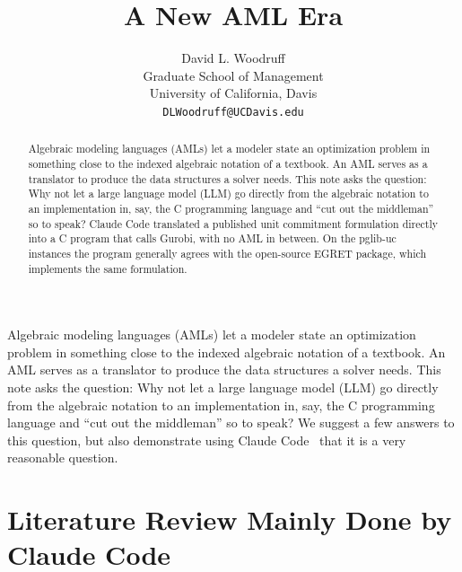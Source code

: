 \documentclass[11pt]{article}
\title{A New AML Era}
\author{David L. Woodruff\\Graduate School of Management\\University of California, Davis\\\texttt{DLWoodruff@UCDavis.edu}}
\date{}
\begin{document}
\maketitle

\begin{abstract}
Algebraic modeling languages (AMLs) let a modeler state an
optimization problem in something close to the indexed algebraic
notation of a textbook. An AML serves as a translator to produce the data
structures a solver needs.  This note asks the question: Why not let a
large language model (LLM) go directly from the algebraic notation to
an implementation in, say, the C programming language and ``cut out the
middleman'' so to speak?
Claude Code translated a published unit commitment formulation directly into a C program that calls Gurobi, with no AML in between. On the pglib-uc instances the program generally agrees with the open-source EGRET package, which implements the same formulation.
\end{abstract}

Algebraic modeling languages (AMLs) let a modeler state an
optimization problem in something close to the indexed algebraic
notation of a textbook. An AML serves as a translator to produce the data
structures a solver needs.  This note asks the question: Why not let a
large language model (LLM) go directly from the algebraic notation to
an implementation in, say, the C programming language and ``cut out the
middleman'' so to speak? We suggest a few answers to this question, but
also demonstrate using Claude Code~\cite{claudecode} that it is a very
reasonable question.


\section{Literature Review Mainly Done by Claude Code}
\end{document}
